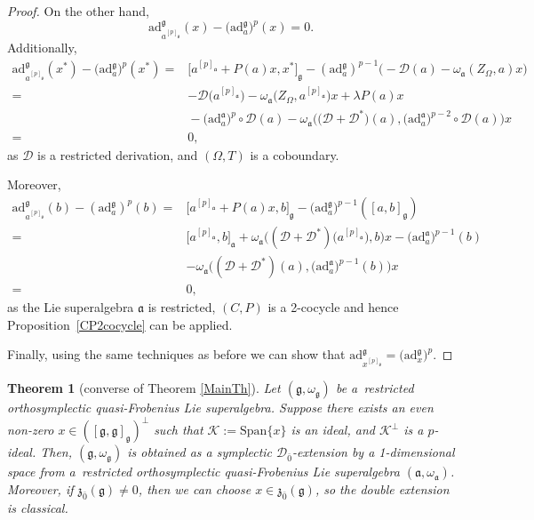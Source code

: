 \documentclass[10pt,a4paper]{amsart}
\numberwithin{equation}{section}
\newtheorem{Theorem}{Theorem}[section]
\begin{document}
\begin{proof}
On the other hand,
\[
\mathrm{ad}_{a^{[p]_\mathfrak{g}}}^\mathfrak{g}(x)-\big(\mathrm{ad}_{a}^\mathfrak{g}\big)^p(x) = 0.
\]
Additionally,
\begin{align*}
\mathrm{ad}_{a^{[p]_\mathfrak{g}}}^\mathfrak{g}(x^*)-\bigl(\mathrm{ad}_{a}^\mathfrak{g}\bigr)^p(x^*) ={}& \big[a^{[p]_\mathfrak{a}}+P(a)x, x^*\big]_\mathfrak{g}-(\mathrm{ad}_{a}^\mathfrak{g})^{p-1}\bigl(-\mathscr{D}(a)-\omega_\mathfrak{a}(Z_\Omega,a)x\bigr)\\
={}& -{\mathscr D}\bigl(a^{[p]_\mathfrak{a}}\bigr)-\omega_\mathfrak{a}\bigl(Z_\Omega, a^{[p]_\mathfrak{a}}\bigr)x+\lambda P(a)x\\
&{}-\bigl(\mathrm{ad}_a^\mathfrak{a}\bigr)^p\circ {\mathscr D}(a)-\omega_\mathfrak{a}\bigl(\bigl({\mathscr D}+{\mathscr D}^*\bigr)(a), \bigl(\mathrm{ad}_a^\mathfrak{a}\bigr)^{p-2}\circ {\mathscr D}(a)\bigr)x\\
={}&0,
\end{align*}
as ${\mathscr D}$ is a restricted derivation, and $(\Omega, T)$ is a coboundary.

Moreover,
\begin{align*}
\mathrm{ad}_{a^{[p]_\mathfrak{g}}}^\mathfrak{g}(b)-(\mathrm{ad}_{a}^\mathfrak{g})^p(b) ={}& \big[a^{[p]_\mathfrak{a}}+P(a)x,b\big]_\mathfrak{g}-\bigl(\mathrm{ad}_a^\mathfrak{g}\bigr)^{p-1}([a,b]_\mathfrak{g})\\
={}& \big[a^{[p]_\mathfrak{a}},b\big]_\mathfrak{a}+\omega_\mathfrak{a}\bigl(({\mathscr D}+{\mathscr D}^*)\bigl(a^{[p]_\mathfrak{a}}\bigr), b\bigr)x- \bigl(\mathrm{ad}_a^\mathfrak{a}\bigr)^{p-1}(b)\\
&-\omega_\mathfrak{a}\bigl(({\mathscr D}+{\mathscr D}^*)(a), \bigl(\mathrm{ad}_a^\mathfrak{a}\bigr)^{p-1}(b)\bigr)x\\
={}&0,
\end{align*}
as the Lie superalgebra $\mathfrak{a}$ is restricted, $(C,P)$ is a 2-cocycle and hence Proposition~\ref{CP2cocycle} can be applied.

Finally, using the same techniques as before we can show that $\mathrm{ad}_{x^{[p]_\mathfrak{g}}}^\mathfrak{g}=\big(\mathrm{ad}_x^\mathfrak{g}\big)^p$.
\end{proof}

\begin{Theorem}[converse of Theorem \ref{MainTh}]
\label{Rec1}
Let $(\mathfrak{g},\omega_\mathfrak{g})$ be a~restricted orthosymplectic quasi-Frobenius Lie superalgebra. Suppose there exists an even non-zero $x\in ([\mathfrak{g}, \mathfrak{g}]_\mathfrak{g})^\perp$ such that $\mathscr{K}:=\mathrm{Span}\{x\}$ is an ideal, and $\mathscr{K}^\perp$ is a $p$-ideal. Then, $(\mathfrak{g},\omega_\mathfrak{g})$ is obtained as a symplectic ${\mathscr D}_{\bar 0}$-extension by a 1-dimensional space from a~restricted orthosymplectic quasi-Frobenius Lie superalgebra $(\mathfrak{a},\omega_\mathfrak{a})$. Moreover, if $\mathfrak{z}_{\bar 0}(\mathfrak{g})\not =0$, then we can choose $x \in \mathfrak{z}_{\bar 0}(\mathfrak{g})$, so the double extension is classical.

\end{Theorem}
\end{document}
